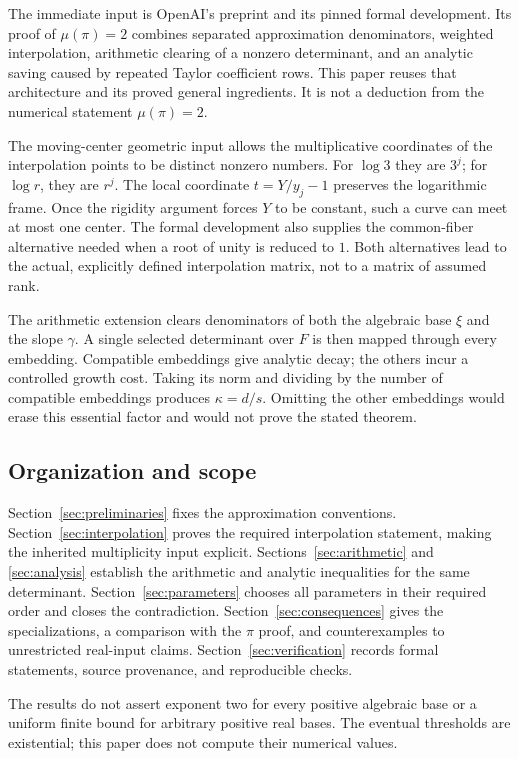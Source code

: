 The immediate input is OpenAI's preprint \cite{OAIpi} and its pinned
formal development. Its proof of
\(\mu(\pi)=2\) combines separated approximation denominators, weighted
interpolation, arithmetic clearing of a nonzero determinant, and an
analytic saving caused by repeated Taylor coefficient rows.
This paper reuses that architecture and its proved general ingredients.
It is not a deduction from the numerical statement \(\mu(\pi)=2\).

The moving-center geometric input allows the multiplicative coordinates of the
interpolation points to be distinct nonzero numbers. For \(\log3\)
they are \(3^j\); for \(\log r\), they are \(r^j\).
The local coordinate \(t=Y/y_j-1\) preserves the logarithmic frame.
Once the rigidity argument forces \(Y\) to be constant, such a curve
can meet at most one center. The formal development also supplies the
common-fiber alternative needed when a root of unity is reduced to \(1\).
Both alternatives lead to the actual, explicitly defined interpolation
matrix, not to a matrix of assumed rank.

The arithmetic extension clears denominators of both the algebraic base
\(\xi\) and the slope \(\gamma\). A single selected determinant over
\(F\) is then mapped through every embedding. Compatible embeddings
give analytic decay; the others incur a controlled growth cost.
Taking its norm and dividing by the number of compatible embeddings
produces \(\kappa=d/s\). Omitting the other embeddings would erase this
essential factor and would not prove the stated theorem.

\subsection{Organization and scope}

Section~\ref{sec:preliminaries} fixes the approximation conventions.
Section~\ref{sec:interpolation} proves the required interpolation
statement, making the inherited multiplicity input explicit.
Sections~\ref{sec:arithmetic} and \ref{sec:analysis} establish the
arithmetic and analytic inequalities for the same determinant.
Section~\ref{sec:parameters} chooses all parameters in their required
order and closes the contradiction.
Section~\ref{sec:consequences} gives the specializations, a comparison
with the \(\pi\) proof, and counterexamples to unrestricted real-input
claims. Section~\ref{sec:verification} records formal statements,
source provenance, and reproducible checks.

The results do not assert exponent two for every positive algebraic
base or a uniform finite bound for arbitrary positive real bases.
The eventual thresholds are existential; this paper does not compute
their numerical values.
